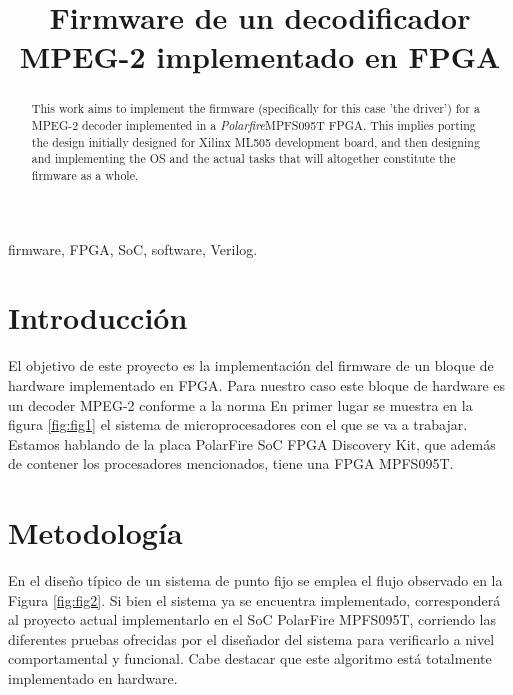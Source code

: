 \documentclass[conference]{IEEEtran}
\begin{document}
\title{Firmware de un decodificador MPEG-2 implementado en FPGA}

\author{
}

\maketitle

\begin{abstract}
This work aims to implement the firmware (specifically for this case 'the driver') for a MPEG-2 decoder implemented in a \textit{Polarfire}\textregistered MPFS095T FPGA. This implies porting the design initially designed for Xilinx ML505 development board, and then designing and implementing the OS and the actual tasks that will altogether constitute the firmware as a whole.
\end{abstract}

\begin{IEEEkeywords}
firmware, FPGA, SoC, software, Verilog.
\end{IEEEkeywords}

\section{Introducción}
El objetivo de este proyecto es la implementación del firmware de un bloque de hardware implementado en FPGA. Para nuestro caso este bloque de hardware es un decoder MPEG-2 conforme a la norma En primer lugar se muestra en la figura \ref{fig:fig1} el sistema de microprocesadores con el que se va a trabajar. Estamos hablando de la placa PolarFire SoC FPGA Discovery Kit, que además de contener los procesadores mencionados, tiene una FPGA MPFS095T.


\section{Metodología}
En el diseño típico de un sistema de punto fijo se emplea el  flujo observado en la Figura \ref{fig:fig2}. Si bien el sistema ya se encuentra implementado, corresponderá al proyecto actual implementarlo en el SoC PolarFire MPFS095T, corriendo las diferentes pruebas ofrecidas por el diseñador del sistema para verificarlo a nivel comportamental y funcional. Cabe destacar que este algoritmo está totalmente implementado en hardware. 
\end{document}
